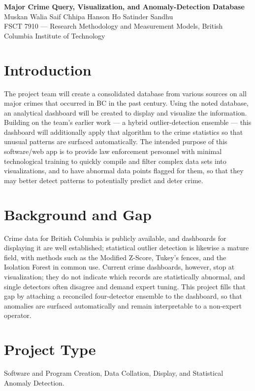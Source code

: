 \documentclass[10pt]{article}
\newcommand{\heading}[1]{\section*{#1}}
\begin{document}
\begin{center}
{\bfseries Major Crime Query, Visualization, and Anomaly-Detection Database}\\
{\small Muskan Walia \quad Saif Chhipa \quad Hanson Ho \quad Satinder Sandhu}\\
{\small FSCT 7910 --- Research Methodology and Measurement Models, British Columbia Institute of Technology}
\end{center}

\heading{Introduction}
The project team will create a consolidated database from various sources on all major crimes that occurred in BC in the past century. Using the noted database, an analytical dashboard will be created to display and visualize the information. Building on the team's earlier work --- a hybrid outlier-detection ensemble --- this dashboard will additionally apply that algorithm to the crime statistics so that unusual patterns are surfaced automatically. The intended purpose of this software/web app is to provide law enforcement personnel with minimal technological training to quickly compile and filter complex data sets into visualizations, and to have abnormal data points flagged for them, so that they may better detect patterns to potentially predict and deter crime.

\heading{Background and Gap}
Crime data for British Columbia is publicly available, and dashboards for displaying it are well established; statistical outlier detection is likewise a mature field, with methods such as the Modified Z-Score, Tukey's fences, and the Isolation Forest in common use. Current crime dashboards, however, stop at visualization; they do not indicate which records are statistically abnormal, and single detectors often disagree and demand expert tuning. This project fills that gap by attaching a reconciled four-detector ensemble to the dashboard, so that anomalies are surfaced automatically and remain interpretable to a non-expert operator.

\heading{Project Type}
Software and Program Creation, Data Collation, Display, and Statistical Anomaly Detection.
\end{document}
